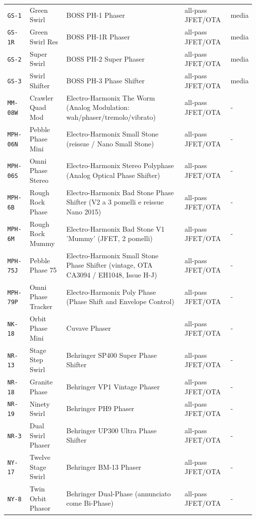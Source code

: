\begin{xltabular}{\linewidth}{@{}l l X l l@{}}
\texttt{GS-1} & Green Swirl & BOSS PH-1 Phaser & all-pass JFET/OTA & media\\
\texttt{GS-1R} & Green Swirl Res & BOSS PH-1R Phaser & all-pass JFET/OTA & media\\
\texttt{GS-2} & Super Swirl & BOSS PH-2 Super Phaser & all-pass JFET/OTA & media\\
\texttt{GS-3} & Swirl Shifter & BOSS PH-3 Phase Shifter & all-pass JFET/OTA & media\\
\texttt{MM-08W} & Crawler Quad Mod & Electro-Harmonix The Worm (Analog Modulation: wah/phaser/tremolo/vibrato) & all-pass JFET/OTA & -\\
\texttt{MPH-06N} & Pebble Phase Mini & Electro-Harmonix Small Stone (reissue / Nano Small Stone) & all-pass JFET/OTA & -\\
\texttt{MPH-06S} & Omni Phase Stereo & Electro-Harmonix Stereo Polyphase (Analog Optical Phase Shifter) & all-pass JFET/OTA & -\\
\texttt{MPH-6B} & Rough Rock Phase & Electro-Harmonix Bad Stone Phase Shifter (V2 a 3 pomelli e reissue Nano 2015) & all-pass JFET/OTA & -\\
\texttt{MPH-6M} & Rough Rock Mummy & Electro-Harmonix Bad Stone V1 'Mummy' (JFET, 2 pomelli) & all-pass JFET/OTA & -\\
\texttt{MPH-75J} & Pebble Phase 75 & Electro-Harmonix Small Stone Phase Shifter (vintage, OTA CA3094 / EH1048, Issue H-J) & all-pass JFET/OTA & -\\
\texttt{MPH-79P} & Omni Phase Tracker & Electro-Harmonix Poly Phase (Phase Shift and Envelope Control) & all-pass JFET/OTA & -\\
\texttt{NK-18} & Orbit Phase Mini & Cuvave Phaser & all-pass JFET/OTA & -\\
\texttt{NR-13} & Stage Step Swirl & Behringer SP400 Super Phase Shifter & all-pass JFET/OTA & -\\
\texttt{NR-18} & Granite Phase & Behringer VP1 Vintage Phaser & all-pass JFET/OTA & -\\
\texttt{NR-19} & Ninety Swirl & Behringer PH9 Phaser & all-pass JFET/OTA & -\\
\texttt{NR-3} & Dual Swirl Phaser & Behringer UP300 Ultra Phase Shifter & all-pass JFET/OTA & -\\
\texttt{NY-17} & Twelve Stage Swirl & Behringer BM-13 Phaser & all-pass JFET/OTA & -\\
\texttt{NY-8} & Twin Orbit Phasor & Behringer Dual-Phase (annunciato come Bi-Phase) & all-pass JFET/OTA & -\\

\end{xltabular}
